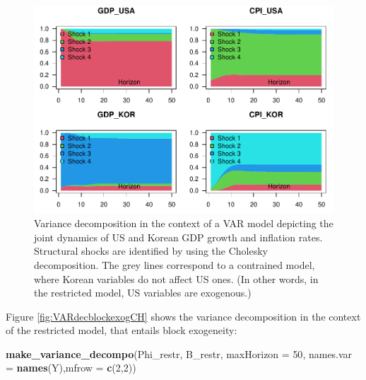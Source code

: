 \documentclass[
  12pt,
]{book}
\newenvironment{Shaded}{\begin{snugshade}}{\end{snugshade}}
\newcommand{\AttributeTok}[1]{\textcolor[rgb]{0.13,0.29,0.53}{#1}}
\newcommand{\DecValTok}[1]{\textcolor[rgb]{0.00,0.00,0.81}{#1}}
\newcommand{\FunctionTok}[1]{\textcolor[rgb]{0.13,0.29,0.53}{\textbf{#1}}}
\newcommand{\NormalTok}[1]{#1}
\theoremstyle{definition}
\theoremstyle{definition}
\theoremstyle{definition}
\theoremstyle{definition}
\theoremstyle{remark}
\begin{document}
\begin{figure}
\includegraphics[width=0.95\linewidth]{IdentifStructShocks_files/figure-latex/VARdecblockexogUS-1} \caption{Variance decomposition in the context of a VAR model depicting the joint dynamics of US and Korean GDP growth and inflation rates. Structural shocks are identified by using the Cholesky decomposition. The grey lines correspond to a contrained model, where Korean variables do not affect US ones. (In other words, in the restricted model, US variables are exogenous.)}\label{fig:VARdecblockexogUS}
\end{figure}

Figure \ref{fig:VARdecblockexogCH} shows the variance decomposition in the context of the restricted model, that entails block exogeneity:

\begin{Shaded}
\begin{Highlighting}[]
\FunctionTok{make\_variance\_decompo}\NormalTok{(Phi\_restr, B\_restr, }\AttributeTok{maxHorizon =} \DecValTok{50}\NormalTok{,}
                      \AttributeTok{names.var =} \FunctionTok{names}\NormalTok{(Y),}\AttributeTok{mfrow =} \FunctionTok{c}\NormalTok{(}\DecValTok{2}\NormalTok{,}\DecValTok{2}\NormalTok{))}
\end{Highlighting}
\end{Shaded}
\end{document}
